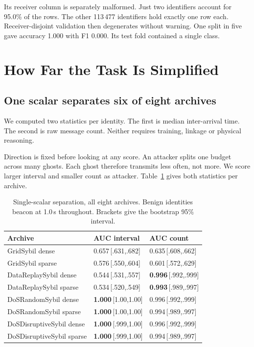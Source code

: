 \documentclass[journal,twoside]{IEEEtran}
\begin{document}
Its receiver column is separately malformed.
Just two identifiers account for 95.0\% of the rows.
The other 113\,477 identifiers hold exactly one row each.
Receiver-disjoint validation then degenerates without warning.
One split in five gave accuracy 1.000 with F1 0.000.
Its test fold contained a single class.

\section{How Far the Task Is Simplified}

\subsection{One scalar separates six of eight archives}

We computed two statistics per identity.
The first is median inter-arrival time.
The second is raw message count.
Neither requires training, linkage or physical reasoning.

Direction is fixed before looking at any score.
An attacker splits one budget across many ghosts.
Each ghost therefore transmits less often, not more.
We score larger interval and smaller count as attacker.
Table~\ref{tab:scalar} gives both statistics per archive.

\begin{table}[t]
\caption{Single-scalar separation, all eight archives.
Benign identities beacon at 1.0\,s throughout.
Brackets give the bootstrap 95\% interval.}
\label{tab:scalar}
\centering
\footnotesize
\begin{tabular}{lll}
\toprule
Archive & AUC interval & AUC count \\
\midrule
GridSybil dense           & 0.657\,[.631,.682] & 0.635\,[.608,.662] \\
GridSybil sparse          & 0.576\,[.550,.604] & 0.601\,[.572,.629] \\
DataReplaySybil dense     & 0.544\,[.531,.557] & \textbf{0.996}\,[.992,.999] \\
DataReplaySybil sparse    & 0.534\,[.520,.549] & \textbf{0.993}\,[.989,.997] \\
DoSRandomSybil dense      & \textbf{1.000}\,[1.00,1.00] & 0.996\,[.992,.999] \\
DoSRandomSybil sparse     & \textbf{1.000}\,[1.00,1.00] & 0.994\,[.989,.997] \\
DoSDisruptiveSybil dense  & \textbf{1.000}\,[.999,1.00] & 0.996\,[.992,.999] \\
DoSDisruptiveSybil sparse & \textbf{1.000}\,[.999,1.00] & 0.994\,[.989,.997] \\
\bottomrule
\end{tabular}
\end{table}
\end{document}
